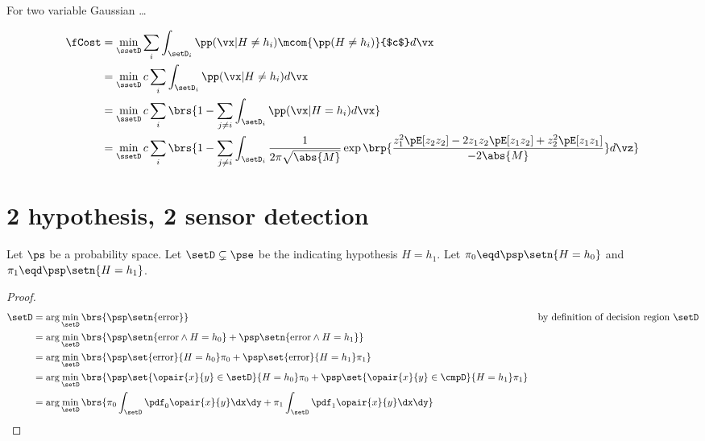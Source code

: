 For two variable Gaussian \ldots

\begin{align*}
  \fCost
    &= \min_\ssetD \sum_i \int_{\setD_i} \pp(\vx|H\ne h_i)\mcom{\pp(H\ne h_i)}{$c$} d\vx
  \\&= \min_\ssetD c\sum_i \int_{\setD_i} \pp(\vx|H\ne h_i) d\vx 
  \\&= \min_\ssetD c\sum_i\brs{1- \sum_{j\ne i}\int_{\setD_i} \pp(\vx|H=h_i) d\vx} 
  \\&= \min_\ssetD c\sum_i \brs{1-\sum_{j\ne i}\int_{\setD_i} 
         \frac{1}{2\pi \sqrt{\abs{M}}}
         \exp\brp{\frac{z_1^2\pE[z_2z_2] - 2z_1z_2\pE[z_1z_2] + z_2^2\pE[z_1z_1]}
                       {-2\abs{M}}} d\vz}
\end{align*}


\section{2 hypothesis, 2 sensor detection}

\begin{theorem}
Let $\ps$ be a probability space.
Let $\setD\subsetneq\pse$ be the  indicating hypothesis $H=h_1$. 
Let $\pi_0\eqd\psp\setn{H=h_0}$ and $\pi_1\eqd\psp\setn{H=h_1}$.
\end{theorem}
\begin{proof}
\begin{align*}
  \setD 
    &= \arg\min_\setD\brs{\psp\setn{\text{error}}}
    && \text{by definition of decision region $\setD$}
  \\&= \arg\min_\setD\brs{
         \psp\setn{\text{error}\land H=h_0} +
         \psp\setn{\text{error}\land H=h_1}
         }
  \\&= \arg\min_\setD\brs{
         \psp\set{\text{error}}{H=h_0}\pi_0 +
         \psp\set{\text{error}}{H=h_1}\pi_1
         }
  \\&= \arg\min_\setD\brs{
         \psp\set{\opair{x}{y}\in\setD}{H=h_0}\pi_0 + 
         \psp\set{\opair{x}{y}\in\cmpD}{H=h_1}\pi_1
         }
  \\&= \arg\min_\setD\brs{
         \pi_0\int_\setD \pdf_0\opair{x}{y} \dx\dy + 
         \pi_1\int_\setD \pdf_1\opair{x}{y} \dx\dy 
         }
\end{align*}
\end{proof}

